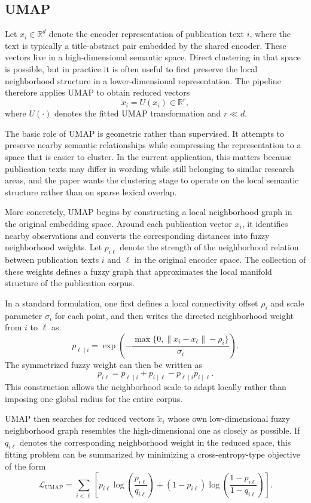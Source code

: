 \documentclass[11pt]{article}
\begin{document}
\subsection{UMAP}
\label{app:topic_pipeline}

Let $x_i \in \mathbb{R}^{d}$ denote the encoder representation of publication text $i$, where the text is typically a title-abstract pair embedded by the shared encoder. These vectors live in a high-dimensional semantic space. Direct clustering in that space is possible, but in practice it is often useful to first preserve the local neighborhood structure in a lower-dimensional representation. The pipeline therefore applies UMAP \citep{mcinnes2018umap} to obtain reduced vectors
\[
\tilde{x}_i = U(x_i) \in \mathbb{R}^{r},
\]
where $U(\cdot)$ denotes the fitted UMAP transformation and $r \ll d$.

The basic role of UMAP is geometric rather than supervised. It attempts to preserve nearby semantic relationships while compressing the representation to a space that is easier to cluster. In the current application, this matters because publication texts may differ in wording while still belonging to similar research areas, and the paper wants the clustering stage to operate on the local semantic structure rather than on sparse lexical overlap.

More concretely, UMAP begins by constructing a local neighborhood graph in the original embedding space. Around each publication vector $x_i$, it identifies nearby observations and converts the corresponding distances into fuzzy neighborhood weights. Let $p_{i\ell}$ denote the strength of the neighborhood relation between publication texts $i$ and $\ell$ in the original encoder space. The collection of these weights defines a fuzzy graph that approximates the local manifold structure of the publication corpus.

In a standard formulation, one first defines a local connectivity offset $\rho_i$ and scale parameter $\sigma_i$ for each point, and then writes the directed neighborhood weight from $i$ to $\ell$ as
\[
p_{\ell \mid i}
=
\exp\!\left(
-\frac{\max\{0,\|x_i-x_\ell\|-\rho_i\}}{\sigma_i}
\right).
\]
The symmetrized fuzzy weight can then be written as
\[
p_{i\ell}
=
p_{\ell \mid i}+p_{i \mid \ell}-p_{\ell \mid i}p_{i \mid \ell}.
\]
This construction allows the neighborhood scale to adapt locally rather than imposing one global radius for the entire corpus.

UMAP then searches for reduced vectors $\tilde{x}_i$ whose own low-dimensional fuzzy neighborhood graph resembles the high-dimensional one as closely as possible. If $q_{i\ell}$ denotes the corresponding neighborhood weight in the reduced space, this fitting problem can be summarized by minimizing a cross-entropy-type objective of the form
\[
\mathcal{L}_{\mathrm{UMAP}}
=
\sum_{i<\ell}
\left[
p_{i\ell}\log\!\left(\frac{p_{i\ell}}{q_{i\ell}}\right)
+ (1-p_{i\ell})\log\!\left(\frac{1-p_{i\ell}}{1-q_{i\ell}}\right)
\right].
\]
\end{document}
